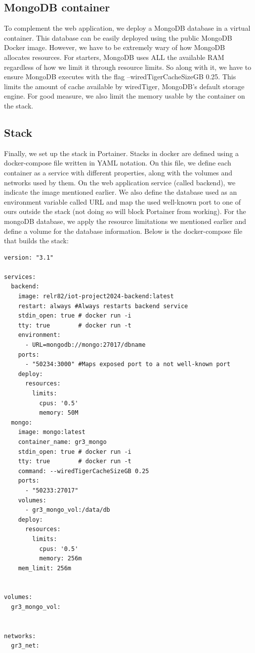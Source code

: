 \subsection{MongoDB container}

To complement the web application, we deploy a MongoDB database in a virtual container. This database can be easily deployed using the public MongoDB Docker image. However, we have to be extremely wary of how MongoDB allocates resources. For starters, MongoDB uses ALL the available RAM regardless of how we limit it through resource limits. So along with it, we have to ensure MongoDB executes with the flag --wiredTigerCacheSizeGB 0.25. This limits the amount of cache available by wiredTiger, MongoDB's default storage engine. For good measure, we also limit the memory usable by the container on the stack. 

\subsection{Stack}

Finally, we set up the stack in Portainer. Stacks in docker are defined using a docker-compose file written in YAML notation. On this file, we define each container as a service with different properties, along with the volumes and networks used by them. On the web application service (called backend), we indicate the image mentioned earlier. We also define the database used as an environment variable called URL and map the used well-known port to one of ours outside the stack (not doing so will block Portainer from working).
For the mongoDB database, we apply the resource limitations we mentioned earlier and define a volume for the database information. Below is the docker-compose file that builds the stack:

\begin{lstlisting}[style=yaml]
version: "3.1"

services:
  backend:
    image: relr82/iot-project2024-backend:latest
    restart: always #Always restarts backend service
    stdin_open: true # docker run -i
    tty: true        # docker run -t
    environment:
      - URL=mongodb://mongo:27017/dbname
    ports:
      - "50234:3000" #Maps exposed port to a not well-known port
    deploy:
      resources:
        limits:
          cpus: '0.5'
          memory: 50M
  mongo:
    image: mongo:latest
    container_name: gr3_mongo
    stdin_open: true # docker run -i
    tty: true        # docker run -t
    command: --wiredTigerCacheSizeGB 0.25
    ports:
      - "50233:27017"
    volumes:
      - gr3_mongo_vol:/data/db
    deploy:
      resources:
        limits:
          cpus: '0.5'
          memory: 256m 
    mem_limit: 256m 


volumes:
  gr3_mongo_vol:  
 

networks:
  gr3_net: 

\end{lstlisting}


